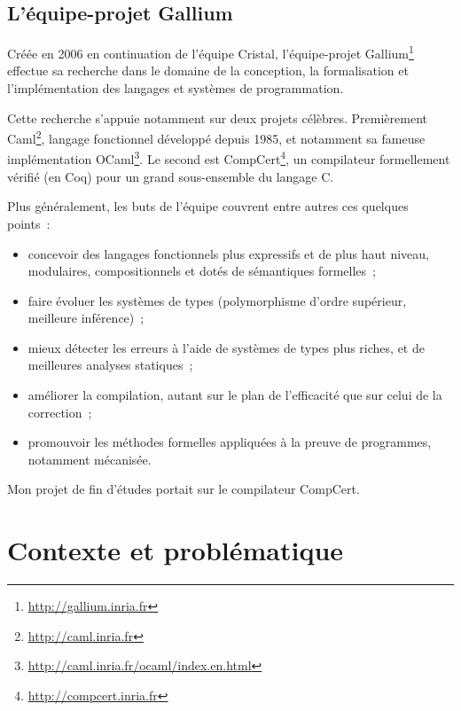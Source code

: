\documentclass{article}
\begin{document}
\subsection{L'équipe-projet Gallium}

Créée en 2006 en continuation de l'équipe Cristal, l'équipe-projet
Gallium\footnote{\href{http://gallium.inria.fr}{http://gallium.inria.fr}}
effectue sa recherche dans le domaine de la conception, la formalisation et
l'implémentation des langages et systèmes de programmation.

Cette recherche s'appuie notamment sur deux projets célèbres. Premièrement
Caml\footnote{\label{caml}\href{http://caml.inria.fr}{http://caml.inria.fr}},
langage fonctionnel développé depuis 1985, et notamment sa fameuse
implémentation OCaml\footnote{\href{http://caml.inria.fr/ocaml/index.en.html}{http://caml.inria.fr/ocaml/index.en.html}}.
Le second est CompCert\footnote{\href{http://compcert.inria.fr/}{http://compcert.inria.fr}}, un
compilateur formellement vérifié (en Coq) pour un grand sous-ensemble du
langage C.

Plus généralement, les buts de l'équipe couvrent entre autres ces quelques
points~:

\begin{itemize}

\item concevoir des langages fonctionnels plus expressifs et de plus haut
niveau, modulaires, compositionnels et dotés de sémantiques formelles~;

\item faire évoluer les systèmes de types (polymorphisme d'ordre supérieur,
meilleure inférence)~;

\item mieux détecter les erreurs à l'aide de systèmes de types plus riches, et
de meilleures analyses statiques~;

\item améliorer la compilation, autant sur le plan de l'efficacité que sur
celui de la correction~;

\item promouvoir les méthodes formelles appliquées à la preuve de programmes,
notamment mécanisée.

\end{itemize}

Mon projet de fin d'études portait sur le compilateur CompCert.

\newpage
\section{Contexte et problématique}
\end{document}
